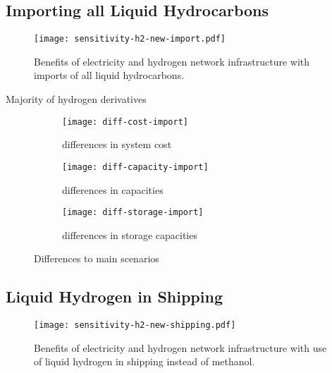 
\subsection{Importing all Liquid Hydrocarbons}
\label{sec:si:sensitivity-imports}

\begin{figure}
    \centering
    \texttt{[image: sensitivity-h2-new-import.pdf]}
    \caption{Benefits of electricity and hydrogen network infrastructure with imports of all liquid hydrocarbons.}
    \label{fig:sensitivity-imports}
\end{figure}

Majority of hydrogen derivatives


\begin{figure}
    \centering
    \begin{subfigure}[t]{\textwidth}
        \centering
        \caption{differences in system cost}
        \texttt{[image: diff-cost-import]}
        \label{fig:sensitivity-import-cost}
    \end{subfigure}
    \begin{subfigure}[t]{\textwidth}
        \centering
        \caption{differences in capacities}
        \texttt{[image: diff-capacity-import]}
        \label{fig:sensitivity-import-cap}
    \end{subfigure}
    \begin{subfigure}[t]{\textwidth}
        \centering
        \caption{differences in storage capacities}
        \texttt{[image: diff-storage-import]}
        \label{fig:sensitivity-import-sto}
    \end{subfigure}
    \caption{Differences to main scenarios}
    \label{fig:sensitivity-import-diff}
\end{figure}


\subsection{Liquid Hydrogen in Shipping}
\label{sec:si:sensitivity-shipping}

\begin{figure}
    \centering
    \texttt{[image: sensitivity-h2-new-shipping.pdf]}
    \caption{Benefits of electricity and hydrogen network infrastructure with use of liquid hydrogen in shipping instead of methanol.}
    \label{fig:sensitivity-shipping}
\end{figure}


